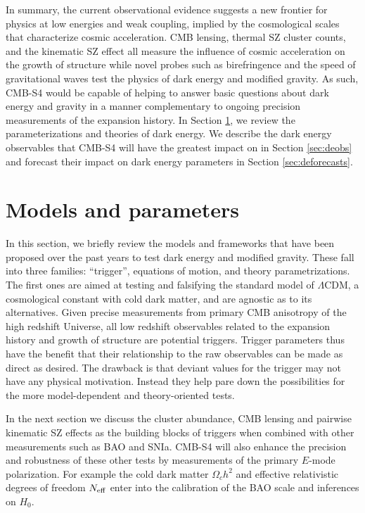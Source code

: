 In summary, the current observational evidence suggests a new frontier for physics at low energies and weak coupling, implied by the cosmological scales that characterize cosmic acceleration.  CMB lensing, thermal SZ cluster counts, and the kinematic SZ effect  all measure the influence of cosmic acceleration on the growth of 
structure while novel probes such as birefringence and the speed of gravitational waves test the physics of dark energy and modified gravity.   As such, CMB-S4 would be capable of helping to answer basic questions about dark energy and gravity in a manner complementary to ongoing precision measurements of the expansion history.    In Section \ref{sec:deparam}, we review the parameterizations and theories of dark energy.  We describe the 
dark energy observables that CMB-S4 will have the greatest impact on in Section \ref{sec:deobs} and forecast their impact on dark energy 
parameters in Section \ref{sec:deforecasts}.

\section{Models and parameters}
\label{sec:deparam}

In this section, we  briefly review the models and frameworks that have been proposed over the past years to test dark energy and modified gravity.   These fall into 
three families: ``trigger'', equations of motion, and theory parametrizations. The first ones are aimed at testing and falsifying the standard model
of $\Lambda$CDM, a cosmological constant with cold dark matter, and are agnostic as to its 
alternatives.  Given precise measurements from primary CMB anisotropy of the high redshift Universe, all low redshift observables related to the expansion history and growth of
structure are potential triggers.  Trigger parameters thus have the benefit that their relationship to the raw observables can be made as direct as desired.   The drawback is 
that deviant values for the trigger may not have any physical motivation.  Instead they help pare down the possibilities for the more model-dependent and theory-oriented tests.  


  In the next section we discuss the cluster abundance,
 CMB lensing and pairwise kinematic SZ effects as the building blocks of triggers when
 combined with other measurements such as BAO and SNIa.   CMB-S4 will also enhance the precision and robustness
 of these other tests by measurements of the primary $E$-mode polarization.   For example
 the cold dark matter $\Omega_c h^2$ and effective relativistic degrees of freedom $N_{\rm eff}$ enter into the calibration of the BAO scale and inferences on $H_0$. 
 
